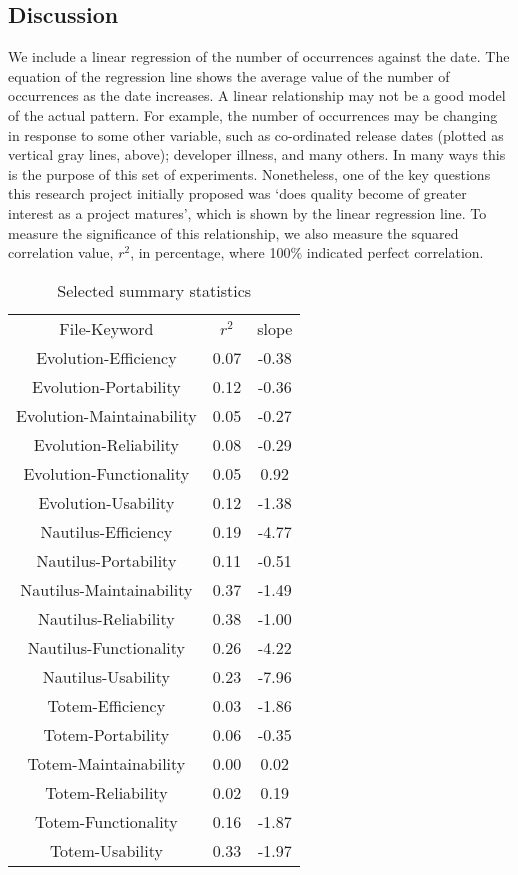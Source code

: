 \documentclass[conference, compsoc]{IEEEtran}
\begin{document}
\subsection{Discussion}
We include a linear regression of the number of occurrences against the date. The equation of the regression line shows the average value of the number of occurrences as the date increases. A linear relationship may not be a good model of the actual pattern. For example, the number of occurrences may be changing in response to some other variable, such as co-ordinated release dates (plotted as vertical gray lines, above); developer illness, and many others. In many ways this is the purpose of this set of experiments. Nonetheless, one of the key questions this research project initially proposed was `does quality become of greater interest as a project matures', which is shown by the linear regression line. To measure the significance of this relationship, we also measure the squared correlation value, $r^2$, in percentage, where 100\% indicated perfect correlation.

\begin{table}
	\caption{Selected summary statistics}
	\centering
	\label{tbl:projects}
\begin{tabular}{|c|c|c|}
\hline
\rowcolor[gray]{.9} 
File-Keyword &  $r^2$ &  slope \\
Evolution-Efficiency & 0.07 & -0.38 \\
Evolution-Portability & 0.12 & -0.36 \\
Evolution-Maintainability & 0.05 & -0.27 \\
Evolution-Reliability & 0.08 & -0.29 \\
Evolution-Functionality & 0.05 & 0.92 \\
Evolution-Usability & 0.12 & -1.38 \\
Nautilus-Efficiency & 0.19 & -4.77 \\
Nautilus-Portability & 0.11 & -0.51 \\
Nautilus-Maintainability & 0.37 & -1.49 \\
Nautilus-Reliability & 0.38 & -1.00 \\
Nautilus-Functionality & 0.26 & -4.22 \\
Nautilus-Usability & 0.23 & -7.96 \\
Totem-Efficiency & 0.03 & -1.86 \\
Totem-Portability & 0.06 & -0.35 \\
Totem-Maintainability & 0.00 & 0.02 \\
Totem-Reliability & 0.02 & 0.19 \\
Totem-Functionality & 0.16 & -1.87 \\
Totem-Usability & 0.33 & -1.97 \\
\hline
\end{tabular}
\end{table}
\end{document}
